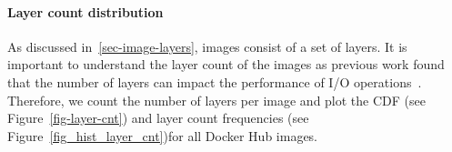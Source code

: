 
%
%
%
%
%
%



\paragraph{Layer count distribution}

As discussed in~\ref{sec-image-layers}, images consist of a set of layers.
It is important to understand the layer count of the images as previous
work found that the number of layers can impact the performance of
I/O operations~\cite{slacker}. Therefore, we count the number of layers
per image and plot the CDF (see Figure~\ref{fig-layer-cnt})
and layer count frequencies (see Figure~\ref{fig_hist_layer_cnt})for all
Docker Hub images.

